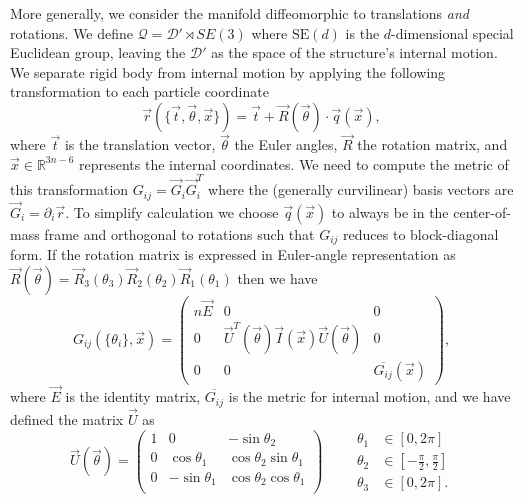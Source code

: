 \documentclass[11pt,twoside]{report}
\begin{document}
More generally, we consider the manifold diffeomorphic to translations \emph{and} rotations.
We define $\mathcal{Q} = \mathcal{D}' \rtimes SE(3)$ where $\textrm{SE}(d)$ is the $d$-dimensional special Euclidean group, leaving the $\mathcal{D}'$ as the space of the structure's internal motion.
We separate rigid body from internal motion by applying the following transformation to each particle coordinate
\begin{equation}
  \vec{r}(\{\vec{t}, \vec{\theta}, \vec{x}\}) =
  \vec{t} + \vec{R}(\vec{\theta}) \cdot \vec{q}(\vec{x}),
\end{equation}
where $\vec{t}$ is the translation vector, $\vec{\theta}$ the Euler angles, $\vec{R}$ the rotation matrix, and $\vec{x} \in \mathbb{R}^{3n-6}$ represents the internal coordinates.
We need to compute the metric of this transformation $G_{ij} = \vec{G}_i \vec{G}_i^T$ where the (generally curvilinear) basis vectors are $\vec{G}_i = \partial_i \vec{r}$.
To simplify calculation we choose $\vec{q}(\vec{x})$ to always be in the center-of-mass frame and orthogonal to rotations such that $G_{ij}$ reduces to block-diagonal form.
If the rotation matrix is expressed in Euler-angle representation as $\vec{R}(\vec{\theta}) = \vec{R}_3(\theta_3) \vec{R}_2(\theta_2) \vec{R}_1(\theta_1)$ then we have%
\begin{equation}
  G_{ij}(\{\theta_i\}, \vec{x}) =
  \begin{pmatrix}
    n \vec{E} & 0 & 0 \\
    0 & \vec{U}^T(\vec{\theta}) \vec{I}(\vec{x}) \vec{U}(\vec{\theta}) & 0 \\
    0 & 0 & \overline{G_{ij}}(\vec{x})
  \end{pmatrix},
\end{equation}
where $\vec{E}$ is the identity matrix, $\overline{G_{ij}}$ is the metric for internal motion, and we have defined the matrix $\vec{U}$ as
\begin{equation}
  \vec{U}(\vec{\theta}) =
  \begin{pmatrix}
    1 &  0              & -\sin{\theta_2} \\
    0 &  \cos{\theta_1} &  \cos{\theta_2} \sin{\theta_1} \\
    0 & -\sin{\theta_1} &  \cos{\theta_2} \cos{\theta_1} \\
  \end{pmatrix}
  \qquad
  \begin{aligned}
    \theta_1 &\in [0,2\pi] \\
    \theta_2 &\in \left[-\frac{\pi}{2},\frac{\pi}{2}\right] \\
    \theta_3 &\in [0,2\pi].
  \end{aligned}
\end{equation}
\end{document}

